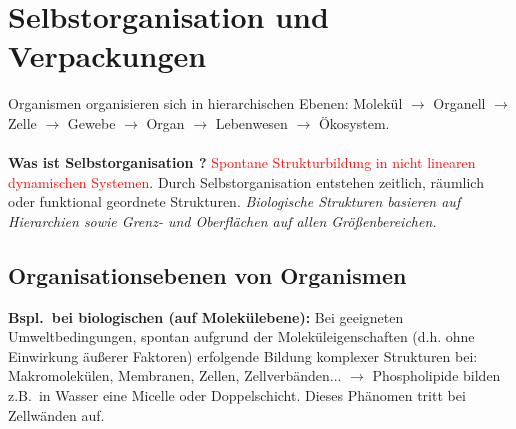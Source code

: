 \section{Selbstorganisation und Verpackungen}

Organismen organisieren sich in hierarchischen Ebenen: Molekül $\rightarrow$ Organell $\rightarrow$ Zelle $\rightarrow$ Gewebe $\rightarrow$ Organ $\rightarrow$ Lebenwesen $\rightarrow$ Ökosystem.
\\\\
\textbf{Was ist Selbstorganisation \dangersign?} \textcolor{red}{Spontane Strukturbildung in nicht linearen dynamischen Systemen}. Durch Selbstorganisation entstehen zeitlich, räumlich oder funktional geordnete Strukturen. \textit{Biologische Strukturen basieren auf Hierarchien sowie Grenz- und Oberflächen auf allen Größenbereichen.}

\subsection{Organisationsebenen von Organismen}

\textbf{Bspl.\ bei biologischen (auf Molekülebene):} Bei geeigneten Umweltbedingungen, spontan aufgrund der Moleküleigenschaften (d.h. ohne Einwirkung äußerer Faktoren) erfolgende Bildung komplexer Strukturen bei: Makromolekülen, Membranen, Zellen, Zellverbänden... $\rightarrow$ Phospholipide bilden z.B.\ in Wasser eine Micelle oder Doppelschicht. Dieses Phänomen tritt bei Zellwänden auf.

